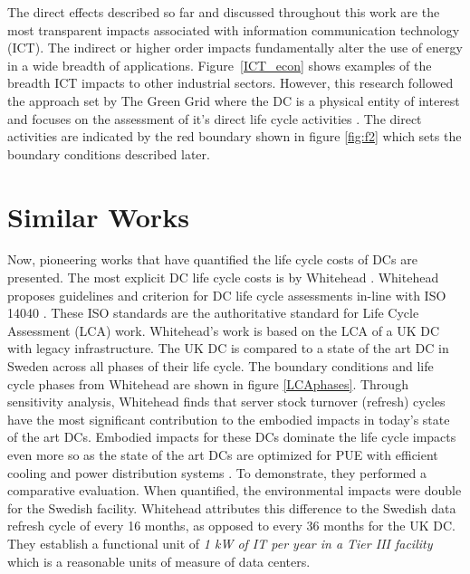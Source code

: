     The direct effects described so far and discussed throughout this work are the most transparent impacts associated with information communication technology (ICT). The indirect or higher order impacts fundamentally alter the use of energy in a wide breadth of applications. Figure~\ref{ICT_econ} shows examples of the breadth ICT impacts to other industrial sectors. However, this research followed the approach set by The Green Grid where the DC is a physical entity of interest and focuses on the assessment of it's direct life cycle activities \cite{tgg12}. The direct activities are indicated by the red boundary shown in figure  \ref{fig:f2} which sets the boundary conditions described later. 
    
    
    
\section{Similar Works}
    
    Now, pioneering works that have quantified the life cycle costs of DCs are presented. The most explicit DC life cycle costs is by Whitehead \cite{whitehead15}. Whitehead proposes guidelines and criterion for DC life cycle assessments in-line with ISO 14040 \cite{ISO14040}. These ISO standards are the authoritative standard for Life Cycle Assessment (LCA) work.  Whitehead's work is based on the LCA of a UK DC with legacy infrastructure. The UK DC is compared to a state of the art DC in Sweden across all phases of their life cycle. The boundary conditions and life cycle phases from Whitehead are shown in figure \ref{LCAphases}. Through sensitivity analysis, Whitehead finds that server stock turnover (refresh) cycles have  the most significant contribution to the embodied impacts in today's state of the art DCs.  Embodied impacts for these DCs dominate the life cycle impacts even more so as the state of the art DCs are optimized for PUE with efficient cooling and power distribution systems . To demonstrate, they performed a comparative evaluation. When quantified, the environmental impacts were double for the Swedish facility. Whitehead attributes this difference to the Swedish data refresh cycle of every 16 months, as opposed to every 36 months for the UK DC. They establish a functional unit of \textit{1 kW of IT per year in a Tier III facility} which is a reasonable units of measure of data centers.
    
    
    
